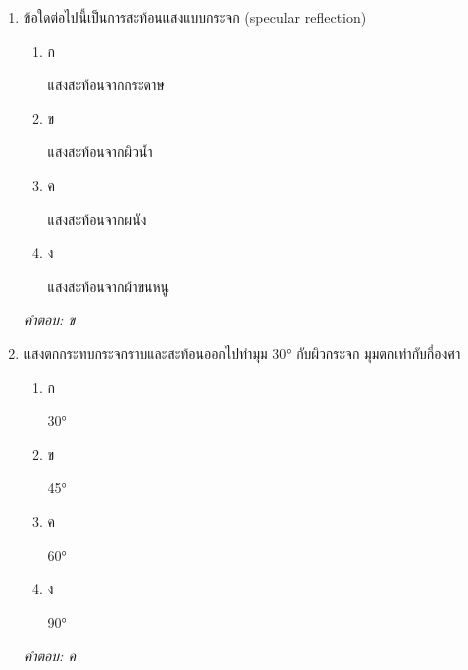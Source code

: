 \documentclass[12pt]{article}
\begin{document}
\begin{enumerate}[label=\arabic*., itemsep=0.5\baselineskip, topsep=0.5\baselineskip, leftmargin=*]
\item ข้อใดต่อไปนี้เป็นการสะท้อนแสงแบบกระจก (specular reflection)
\begin{enumerate}[label=\alph*)., itemsep=0.3\baselineskip, topsep=0.3\baselineskip]
\item ก\ 
\begin{minipage}[t]{0.9\linewidth}
\raggedright แสงสะท้อนจากกระดาษ
\end{minipage}
\item ข\ 
\begin{minipage}[t]{0.9\linewidth}
\raggedright แสงสะท้อนจากผิวน้ำ
\end{minipage}
\item ค\ 
\begin{minipage}[t]{0.9\linewidth}
\raggedright แสงสะท้อนจากผนัง
\end{minipage}
\item ง\ 
\begin{minipage}[t]{0.9\linewidth}
\raggedright แสงสะท้อนจากผ้าขนหนู
\end{minipage}
\end{enumerate}
\vspace{-0.3\baselineskip}
\begin{small}
\textit{คำตอบ: ข}
\end{small}

\item แสงตกกระทบกระจกราบและสะท้อนออกไปทำมุม 30° กับผิวกระจก มุมตกเท่ากับกี่องศา
\begin{enumerate}[label=\alph*)., itemsep=0.3\baselineskip, topsep=0.3\baselineskip]
\item ก\ 
\begin{minipage}[t]{0.9\linewidth}
\raggedright 30°
\end{minipage}
\item ข\ 
\begin{minipage}[t]{0.9\linewidth}
\raggedright 45°
\end{minipage}
\item ค\ 
\begin{minipage}[t]{0.9\linewidth}
\raggedright 60°
\end{minipage}
\item ง\ 
\begin{minipage}[t]{0.9\linewidth}
\raggedright 90°
\end{minipage}
\end{enumerate}
\vspace{-0.3\baselineskip}
\begin{small}
\textit{คำตอบ: ค}
\end{small}


\end{enumerate}
\end{document}
